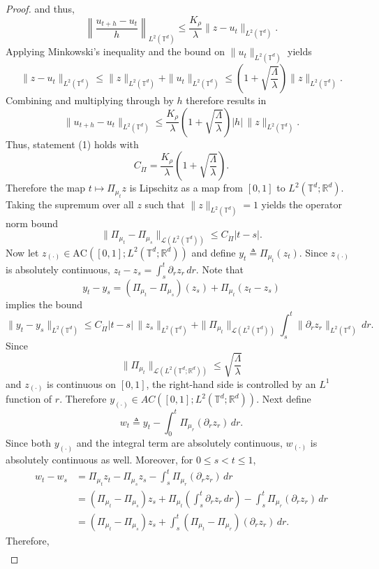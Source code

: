 \documentclass[10pt,a4paper]{amsart}
\begin{document}
\begin{proof}
and thus,
\[
\left\|\frac{u_{t+h}-u_t}{h}\right\|_{L^2(\mathbb{T}^d)}
\le
\frac{K_\rho}{\lambda}\|z-u_t\|_{L^2(\mathbb{T}^d)}.
\]
Applying Minkowski's inequality and the bound on $\|u_t\|_{L^2(\mathbb{T}^d)}$ yields
\[
\|z-u_t\|_{L^2(\mathbb{T}^d)}
\le
\|z\|_{L^2(\mathbb{T}^d)}+\|u_t\|_{L^2(\mathbb{T}^d)}
\le
\left(1+\sqrt{\frac{\Lambda}{\lambda}}\right)\|z\|_{L^2(\mathbb{T}^d)}.
\]
Combining and multiplying through by $h$ therefore results in 
\[
\|u_{t+h}-u_t\|_{L^2(\mathbb{T}^d)}
\le
\frac{K_\rho}{\lambda}
\left(1+\sqrt{\frac{\Lambda}{\lambda}}\right)|h|\,\|z\|_{L^2(\mathbb{T}^d)}.
\]
Thus, statement (1) holds with \[C_{\dot \Pi} = \frac{K_\rho}{\lambda}
\left(1+\sqrt{\frac{\Lambda}{\lambda}}\right).\]
Therefore the map $t \mapsto \Pi_{\mu_t}z$ is Lipschitz as a map from $[0,1]$ to $L^2(\mathbb{T}^d; \mathbb{R}^d)$. Taking the supremum over all $z$ such that $\|z\|_{L^2(\mathbb{T}^d)} = 1$ yields the operator norm bound 
\[
\|\Pi_{\mu_t} - \Pi_{\mu_s}\|_{\mathcal{L}(L^2(\mathbb{T}^d))}
\le
C_{\dot \Pi}|t - s|.
\]
Now let $z_{(\cdot)} \in \text{AC}([0,1]; L^2(\mathbb{T}^d; \mathbb{R}^d))$ and define $y_t \triangleq \Pi_{\mu_t}(z_t).$ Since $z_{(\cdot)}$ is absolutely continuous, $z_t - z_s= \int_{s}^t \partial_r z_r \, dr$. Note that
\[y_t - y_s = (\Pi_{\mu_t} - \Pi_{\mu_s})(z_s) + \Pi_{\mu_t}(z_t-z_s)\]
implies the bound
\[
\|y_t-y_s\|_{L^2(\mathbb{T}^d)}
\le
C_{\dot\Pi}|t-s|\,\|z_s\|_{L^2(\mathbb{T}^d)}
+
\|\Pi_{\mu_t}\|_{\mathcal L(L^2(\mathbb{T}^d))}\int_s^t\|\partial_r z_r\|_{L^2(\mathbb{T}^d)}\,dr.
\]
Since
\[
\|\Pi_{\mu_t}\|_{\mathcal L(L^2(\mathbb{T}^d;\mathbb R^d))}
\le \sqrt{\frac{\Lambda}{\lambda}}
\]
and $z_{(\cdot)}$ is continuous on $[0,1]$, the right-hand side is controlled by
an $L^1$ function of $r$. Therefore $y_{(\cdot)}\in AC([0,1];L^2(\mathbb{T}^d;\mathbb R^d))$. Next define
\[
w_t
\triangleq
y_t-\int_0^t \Pi_{\mu_r}(\partial_r z_r)\,dr.
\]
Since both $y_{(\cdot)}$ and the integral term are absolutely continuous,
$w_{(\cdot)}$ is absolutely continuous as well. Moreover, for $0\le s<t\le 1$,
\begin{align*}
w_t-w_s
&=
\Pi_{\mu_t}z_t-\Pi_{\mu_s}z_s-\int_s^t \Pi_{\mu_r}(\partial_r z_r)\,dr \\
&=
(\Pi_{\mu_t}-\Pi_{\mu_s})z_s
+
\Pi_{\mu_t}\!\left(\int_s^t \partial_r z_r\,dr\right)
-
\int_s^t \Pi_{\mu_r}(\partial_r z_r)\,dr \\
&=
(\Pi_{\mu_t}-\Pi_{\mu_s})z_s
+
\int_s^t(\Pi_{\mu_t}-\Pi_{\mu_r})(\partial_r z_r)\,dr.
\end{align*}
Therefore,
\begin{align*}

\end{align*}
\end{proof}
\end{document}
